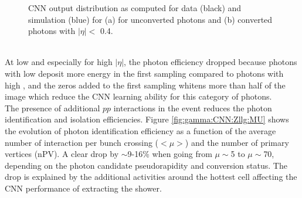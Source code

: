\begin{figure}[h!]
   \centering
	\begin{tcolorbox}[colback=black!5!white,colframe=white!75!black]
    \caption{CNN output distribution as computed for data (black) and simulation (blue) for (a) for unconverted photons and (b) converted photons with $|\eta| < $ 0.4.}
    \label{fig:gamma:CNN:Zllg:CNNOutput}
    \end{tcolorbox}
\end{figure}
\\
At low \eT and especially for high $|\eta|$, the photon efficiency dropped because photons with low \eT deposit more energy in the first sampling compared to photons with high \eT, and the zeros added to the first sampling whitens more than half of the image which reduce the CNN learning ability for this category of photons. \\
The presence of additional $pp$ interactions in the event reduces the photon identification and isolation efficiencies. Figure \ref{fig:gamma:CNN:Zllg:MU} shows the evolution of photon identification efficiency as a function of the average number of interaction per bunch crossing ($<\mu>$) and the number of primary vertices (nPV). A clear drop by $\sim$9-16\% when going from $\mu\sim$5 to $\mu\sim$70, depending on the photon candidate pseudorapidity and conversion status. The drop is explained by the additional activities around the hottest cell affecting the CNN performance of extracting the shower. 
